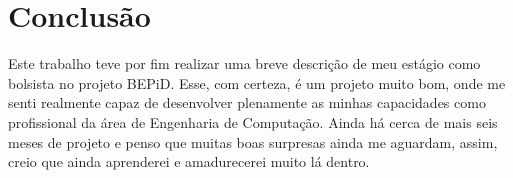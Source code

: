 \documentclass[
	12pt,				%
	openright,			%
	twoside,			%
	a4paper,			%
	english,			%
	french,				%
	spanish,			%
	brazil,				%
	]{abntex2}
\begin{document}
% 

\chapter*[Conclusão]{Conclusão}

Este trabalho teve por fim realizar uma breve descrição de meu estágio como bolsista no projeto BEPiD. Esse, com certeza, é um projeto muito bom, onde me senti realmente capaz de desenvolver plenamente as minhas capacidades como profissional da área de Engenharia de Computação. Ainda há cerca de mais seis meses de projeto e penso que muitas boas surpresas ainda me aguardam, assim, creio que ainda aprenderei e amadurecerei muito lá dentro. 
\postextual


\end{document}
